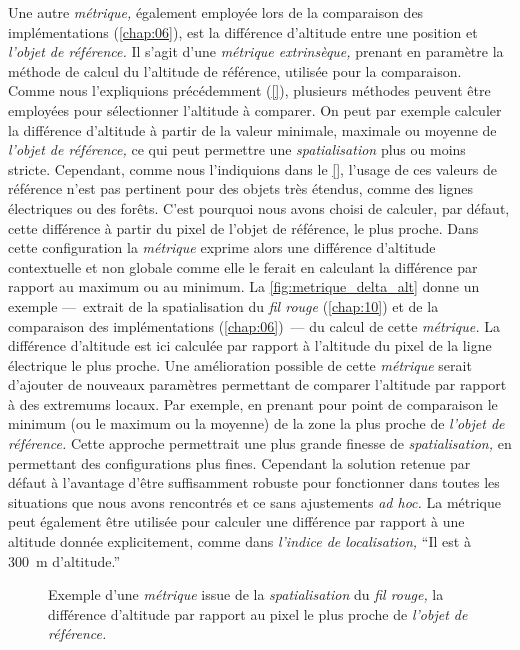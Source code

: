 Une autre \emph{métrique,} également employée lors de la comparaison
des implémentations (\autoref{chap:06}), est la différence d'altitude
entre une position et \emph{l'objet de référence.} Il s'agit d'une
\emph{métrique extrinsèque,} prenant en paramètre la méthode de calcul
du l'altitude de référence, utilisée pour la comparaison. Comme nous
l'expliquions précédemment (\autoref{}), plusieurs méthodes peuvent
être employées pour sélectionner l'altitude à comparer. On peut par
exemple calculer la différence d'altitude à partir de la valeur
minimale, maximale ou moyenne de \emph{l'objet de référence,} ce qui
peut permettre une \emph{spatialisation} plus ou moins
stricte. Cependant, comme nous l'indiquions dans le \autoref{},
l'usage de ces valeurs de référence n'est pas pertinent pour des
objets très étendus, comme des lignes électriques ou des forêts. C'est
pourquoi nous avons choisi de calculer, par défaut, cette différence à
partir du pixel de l'objet de référence, le plus proche. Dans cette
configuration la \emph{métrique}  exprime alors une
différence d'altitude contextuelle et non globale comme elle le ferait
en calculant la différence par rapport au maximum ou au minimum. La
\autoref{fig:metrique_delta_alt} donne un exemple ---~extrait de la
spatialisation du \emph{fil rouge} (\autoref{chap:10}) et de la
comparaison des implémentations (\autoref{chap:06})~--- du calcul de
cette \emph{métrique.} La différence d'altitude est ici calculée par
rapport à l'altitude du pixel de la ligne électrique le plus
proche. Une amélioration possible de cette \emph{métrique} serait
d'ajouter de nouveaux paramètres permettant de comparer l'altitude par
rapport à des extremums locaux. Par exemple, en prenant pour point de
comparaison le minimum (ou le maximum ou la moyenne) de la zone la
plus proche de \emph{l'objet de référence.} Cette approche permettrait
une plus grande finesse de \emph{spatialisation,} en permettant des
configurations plus fines. Cependant la solution retenue par défaut à
l'avantage d'être suffisamment robuste pour fonctionner dans toutes
les situations que nous avons rencontrés et ce sans ajustements
\emph{ad hoc.} La métrique  peut également être
utilisée pour calculer une différence par rapport à une altitude
donnée explicitement, comme dans \emph{l'indice de localisation,}
\enquote{Il est à \SI{300}{\meter} d'altitude.}

\begin{figure}
  \centering
  
  \caption{Exemple d'une \emph{métrique} issue de la
    \emph{spatialisation} du \emph{fil rouge,} la différence
    d'altitude par rapport au pixel le plus proche de \emph{l'objet de
      référence.}}
  \label{fig:metrique_delta_alt}
\end{figure}

